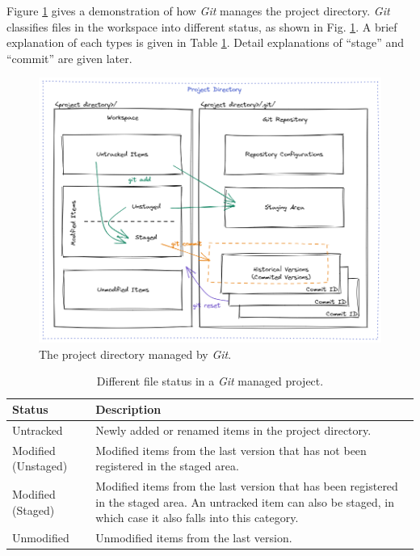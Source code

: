 Figure \ref{ch:sma:fig:gitbasics} gives a demonstration of how \textit{Git} manages the project directory. \textit{Git} classifies files in the workspace into different status, as shown in Fig. \ref{ch:sma:fig:gitbasics}. A brief explanation of each types is given in Table \ref{ch:sma:tab:gitbasics}. Detail explanations of ``stage'' and ``commit'' are given later.
\begin{figure}
	\centering
	\includegraphics[width=350pt]{chapters/ch-software-management-advanced/figures/gitbasics.png}
	\caption{The project directory managed by \textit{Git}.} \label{ch:sma:fig:gitbasics}
\end{figure}

\begin{table}
	\centering \caption{Different file status in a \textit{Git} managed project.}\label{ch:sma:tab:gitbasics}
	\begin{tabularx}{\textwidth}{lX}
		\hline
		Status & Description \\ \hline
		Untracked & Newly added or renamed items in the project directory.  \\ \hdashline
		Modified (Unstaged) & Modified items from the last version that has not been registered in the staged area.  \\ \hdashline
		Modified (Staged) & Modified items from the last version that has been registered in the staged area. An untracked item can also be staged, in which case it also falls into this category. \\ \hdashline
		Unmodified & Unmodified items from the last version. \\ \hline
	\end{tabularx}
\end{table}


